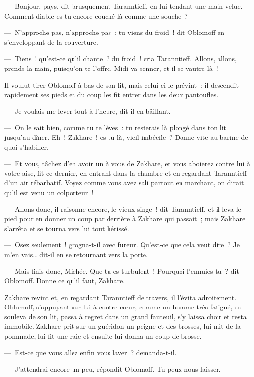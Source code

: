 \documentclass[french,twoside]{book} %
\begin{document}
\noindent — Bonjour, pays, dit brusquement Taranntieff, en lui tendant une main velue. Comment diable es-tu encore couché là comme une souche ?\par
— N’approche pas, n’approche pas : tu viens du froid ! dit Oblomoff en s’enveloppant de la couverture.\par
— Tiens ! qu’est-ce qu’il chante ? du froid ! cria Taranntieff. Allons, allons, prends la main, puisqu’on te l’offre. Midi va sonner, et il se vautre là !\par
Il voulut tirer Oblomoff à bas de son lit, mais celui-ci le prévint : il descendit rapidement ses pieds et du coup les fit entrer dans les deux pantoufles.\par
— Je voulais me lever tout à l’heure, dit-il en bâillant.\par
— On le sait bien, comme tu te lèves : tu resterais là plongé dans ton lit jusqu’au dîner. Eh ! Zakhare ! es-tu là, vieil imbécile ? Donne vite au barine de quoi s’habiller.\par
— Et vous, tâchez d’en avoir un à vous de Zakhare, et vous aboierez contre lui à votre aise, fit ce dernier, en entrant dans la chambre et en regardant Taranntieff d’un air rébarbatif. Voyez comme vous avez sali partout en marchant, on dirait qu’il est venu un colporteur !\par
— Allons donc, il raisonne encore, le vieux singe ! dit Taranntieff, et il leva le pied pour en donner un coup par derrière à Zakhare qui passait ; mais Zakhare s’arrêta et se tourna vers lui tout hérissé.\par
— Osez seulement ! grogna-t-il avec fureur. Qu’est-ce que cela veut dire ? Je m’en vais… dit-il en se retournant vers la porte.\par
— Mais finis donc, Michée. Que tu es turbulent ! Pourquoi l’ennuies-tu ? dit Oblomoff. Donne ce qu’il faut, Zakhare.\par
Zakhare revint et, en regardant Taranntieff de travers, il l’évita adroitement. Oblomoff, s’appuyant sur lui à contre-cœur, comme un homme très-fatigué, se souleva de son lit, passa à regret dans un grand fauteuil, s’y laissa choir et resta immobile. Zakhare prit sur un guéridon un peigne et des brosses, lui mit de la pommade, lui fit une raie et ensuite lui donna un coup de brosse.\par
— Est-ce que vous allez enfin vous laver ? demanda-t-il.\par
— J’attendrai encore un peu, répondit Oblomoff. Tu peux nous laisser.\par
\end{document}
